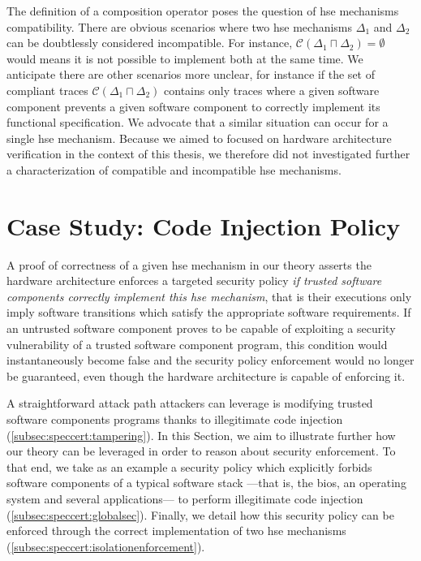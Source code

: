 The definition of a composition operator poses the question of \ac{hse}
mechanisms compatibility.
%
There are obvious scenarios where two \ac{hse} mechanisms \( \Delta_1 \) and
\( \Delta_2 \) can be doubtlessly considered incompatible.
%
For instance, \( \mathcal{C}(\Delta_1 \sqcap \Delta_2) = \emptyset \) would
means it is not possible to implement both at the same time.
%
We anticipate there are other scenarios more unclear, for instance if the set of
compliant traces \( \mathcal{C}(\Delta_1 \sqcap \Delta_2) \) contains only
traces where a given software component prevents a given software component to
correctly implement its functional specification.
%
We advocate that a similar situation can occur for a single \ac{hse} mechanism.
%
Because we aimed to focused on hardware architecture verification in the context
of this thesis, we therefore did not investigated further a characterization of
compatible and incompatible \ac{hse} mechanisms.

\section{Case Study: Code Injection Policy}
\label{sec:speccert:casestudy}

A proof of correctness of a given \ac{hse} mechanism in our theory asserts the
hardware architecture enforces a targeted security policy \emph{if trusted
  software components correctly implement this \ac{hse} mechanism}, that is
their executions only imply software transitions which satisfy the appropriate
software requirements.
%
If an untrusted software component proves to be capable of exploiting a security
vulnerability of a trusted software component program, this condition would
instantaneously become false and the security policy enforcement would no longer
be guaranteed, even though the hardware architecture is capable of enforcing it.

A straightforward attack path attackers can leverage is modifying trusted
software components programs thanks to illegitimate code injection
(\ref{subsec:speccert:tampering}).
%
In this Section, we aim to illustrate further how our theory can be leveraged in
order to reason about security enforcement.
%
To that end, we take as an example a security policy which explicitly forbids
software components of a typical software stack ---that is, the \ac{bios}, an
operating system and several applications--- to perform illegitimate code
injection (\ref{subsec:speccert:globalsec}).
%
Finally, we detail how this security policy can be enforced through the correct
implementation of two \ac{hse} mechanisms
(\ref{subsec:speccert:isolationenforcement}).

